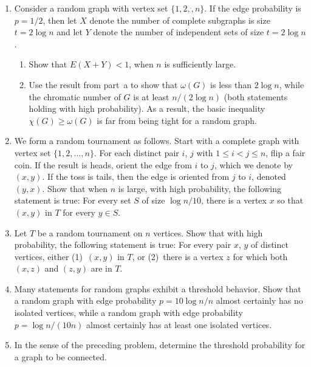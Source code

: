 \begin{enumerate}
\item  Consider a random graph with vertex set $\{1,2,\dot,n\}$.
If the edge probability is $p=1/2$, then let $X$ denote the number
of complete subgraphs is size $t=2\log n$ and let $Y$ denote the
number of independent sets of size $t=2\log n$.
\begin{enumerate}
\item  Show that $E(X+Y)<1$, when $n$ is sufficiently large.
\item  Use the result from part~a to show that $\omega(G)$ is less
than $2\log n$, while the chromatic number of $G$ is at least $n/(2\log n)$
(both statements holding with high probability).  As a result, the basic
inequality $\chi(G)\ge\omega(G)$ is far from being tight for a random
graph.
\end{enumerate}
\item  We form a random tournament as follows.  Start with a complete graph 
with vertex set $\{1,2,\dots,n\}$.  For each distinct
pair $i$, $j$ with $1\le i<j\le n$, flip a fair coin.  If the result is heads,
orient the edge from $i$ to $j$, which we denote by $(x,y)$.  If the toss is
tails, then the edge is oriented from $j$ to $i$, denoted $(y,x)$.
Show that when $n$ is large, with high probability, the following 
statement is true: For every set $S$ of size $\log n/10$, there is a vertex 
$x$ so that $(x,y)$ in $T$ for every $y\in S$.
\item  Let $T$ be a random tournament on $n$ vertices.  Show that with
high probability, the following statement is true: For every pair $x$, $y$
of distinct vertices, either (1)~$(x,y)$ in $T$, or (2)~there is a vertex
$z$ for which both $(x,z)$ and $(z,y)$ are in $T$.
\item Many statements for random graphs exhibit a threshold behavior.
Show that a random graph with edge probability $p=10\log n/n$ almost
certainly has no isolated vertices, while a random graph with edge probability 
$p=\log n/(10 n)$ almost certainly has at least one isolated vertices.
\item In the sense of the preceding problem, determine the threshold probability
for a graph to be connected.
\end{enumerate}

